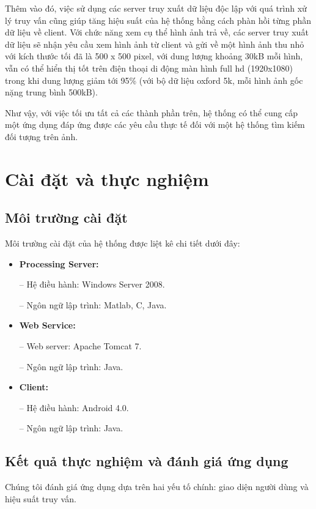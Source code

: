 {Thêm vào đó, việc sử dụng các server truy xuất dữ liệu độc lập với quá trình xử lý truy vấn cũng giúp tăng hiệu suất của hệ thống bằng cách phàn hồi từng phần dữ liệu về client. Với chức năng xem cụ thể hình ảnh trả về, các server truy xuất dữ liệu sẽ nhận yêu cầu xem hình ảnh từ client và gửi về một hình ảnh thu nhỏ với kích thước tối đã là 500 x 500 pixel, với dung lượng khoảng 30kB mỗi hình, vẫn có thể hiển thị tốt trên điện thoại di động màn hình full hd (1920x1080) trong khi dung lượng giảm tới 95\% (với bộ dữ liệu oxford 5k, mỗi hình ảnh gốc nặng trung bình 500kB).

Như vậy, với việc tối ưu tất cả các thành phần trên, hệ thống có thể cung cấp một ứng dụng đáp ứng được các yêu cầu thực tế đối với một hệ thống tìm kiếm đối tượng trên ảnh.

\section{Cài đặt và thực nghiệm}
\label{c5-caidat}
	\subsection{Môi trường cài đặt}
	Môi trường cài đặt của hệ thống được liệt kê chi tiết dưới đây:
	
	\begin{itemize}
	\item \textbf{Processing Server:}
	
	-- Hệ điều hành: Windows Server 2008.
	
	-- Ngôn ngữ lập trình: Matlab, C, Java.
	
	\item \textbf{Web Service:}
	
	-- Web server: Apache Tomcat 7.
	
	-- Ngôn ngữ lập trình: Java.
	
	\item \textbf{Client:}
	
	-- Hệ điều hành: Android 4.0.
	
	-- Ngôn ngữ lập trình: Java. 
	\end{itemize}	
	
	\subsection{Kết quả thực nghiệm và đánh giá ứng dụng}
	Chúng tôi đánh giá ứng dụng dựa trên hai yếu tố chính: giao diện người dùng và hiệu suất truy vấn.
	
}

